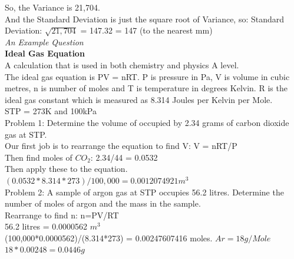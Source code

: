 \documentclass[a4paper,12pt]{report}
\begin{document}
\begin{flushleft}
So, the Variance is 21,704.\\
And the Standard Deviation is just the square root of Variance, so:
Standard Deviation: $\sqrt{21,704}$ = 147.32  = 147 (to the nearest mm)\\


         \emph{ An Example Question}\\
\textbf{Ideal Gas Equation}\\  A calculation that is used in both chemistry and physics A level.\\
The ideal gas equation is PV = nRT. P is pressure in Pa, V is volume in cubic metres, n is number of moles and T is temperature in degrees Kelvin. R is the ideal gas constant which is measured as 8.314 Joules per Kelvin per Mole.\\
STP = 273K and 100kPa\\
Problem 1: Determine the volume of occupied by 2.34 grams of carbon dioxide gas at STP.\\
Our first job is to rearrange the equation to find V: V = nRT/P\\
Then find moles of ${CO}_{2}$: 2.34/44 =  0.0532\\
Then apply these to the equation.\\
$ (0.0532*8.314*273)/100,000 = 0.0012074921  m^3 $\\
Problem 2: A sample of argon gas at STP occupies 56.2 litres. Determine the number of moles of argon and the mass in the sample.\\
Rearrange to find n: n=PV/RT\\
56.2  litres = 0.0000562 $ m^3 $\\
(100,000*0.0000562)/(8.314*273) = 0.00247607416 moles. $ Ar = 18g/Mole $\\
$ 18*0.00248 = 0.0446g $\\


\end{flushleft}
\end{document}
